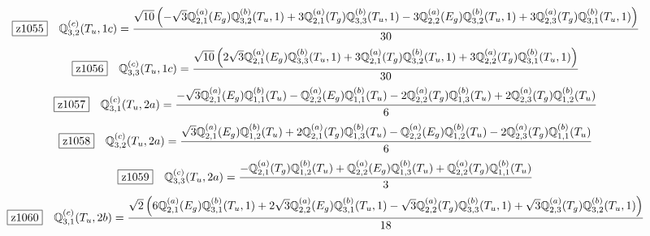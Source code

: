 \documentclass[fleqn,10pt,landscape]{jsarticle}
\begin{document}
\begin{dmath*}
\hspace*{3mm}\fbox{z1055}\quad \mathbb{Q}_{3,2}^{(c)}(T_{u},1c)=\frac{\sqrt{10} \left(- \sqrt{3} \mathbb{Q}_{2,1}^{(a)}(E_{g}) \mathbb{Q}_{3,2}^{(b)}(T_{u},1) + 3 \mathbb{Q}_{2,1}^{(a)}(T_{g}) \mathbb{Q}_{3,3}^{(b)}(T_{u},1) - 3 \mathbb{Q}_{2,2}^{(a)}(E_{g}) \mathbb{Q}_{3,2}^{(b)}(T_{u},1) + 3 \mathbb{Q}_{2,3}^{(a)}(T_{g}) \mathbb{Q}_{3,1}^{(b)}(T_{u},1)\right)}{30}
\end{dmath*}
\begin{dmath*}
\hspace*{3mm}\fbox{z1056}\quad \mathbb{Q}_{3,3}^{(c)}(T_{u},1c)=\frac{\sqrt{10} \left(2 \sqrt{3} \mathbb{Q}_{2,1}^{(a)}(E_{g}) \mathbb{Q}_{3,3}^{(b)}(T_{u},1) + 3 \mathbb{Q}_{2,1}^{(a)}(T_{g}) \mathbb{Q}_{3,2}^{(b)}(T_{u},1) + 3 \mathbb{Q}_{2,2}^{(a)}(T_{g}) \mathbb{Q}_{3,1}^{(b)}(T_{u},1)\right)}{30}
\end{dmath*}
\begin{dmath*}
\hspace*{3mm}\fbox{z1057}\quad \mathbb{Q}_{3,1}^{(c)}(T_{u},2a)=\frac{- \sqrt{3} \mathbb{Q}_{2,1}^{(a)}(E_{g}) \mathbb{Q}_{1,1}^{(b)}(T_{u}) - \mathbb{Q}_{2,2}^{(a)}(E_{g}) \mathbb{Q}_{1,1}^{(b)}(T_{u}) - 2 \mathbb{Q}_{2,2}^{(a)}(T_{g}) \mathbb{Q}_{1,3}^{(b)}(T_{u}) + 2 \mathbb{Q}_{2,3}^{(a)}(T_{g}) \mathbb{Q}_{1,2}^{(b)}(T_{u})}{6}
\end{dmath*}
\begin{dmath*}
\hspace*{3mm}\fbox{z1058}\quad \mathbb{Q}_{3,2}^{(c)}(T_{u},2a)=\frac{\sqrt{3} \mathbb{Q}_{2,1}^{(a)}(E_{g}) \mathbb{Q}_{1,2}^{(b)}(T_{u}) + 2 \mathbb{Q}_{2,1}^{(a)}(T_{g}) \mathbb{Q}_{1,3}^{(b)}(T_{u}) - \mathbb{Q}_{2,2}^{(a)}(E_{g}) \mathbb{Q}_{1,2}^{(b)}(T_{u}) - 2 \mathbb{Q}_{2,3}^{(a)}(T_{g}) \mathbb{Q}_{1,1}^{(b)}(T_{u})}{6}
\end{dmath*}
\begin{dmath*}
\hspace*{3mm}\fbox{z1059}\quad \mathbb{Q}_{3,3}^{(c)}(T_{u},2a)=\frac{- \mathbb{Q}_{2,1}^{(a)}(T_{g}) \mathbb{Q}_{1,2}^{(b)}(T_{u}) + \mathbb{Q}_{2,2}^{(a)}(E_{g}) \mathbb{Q}_{1,3}^{(b)}(T_{u}) + \mathbb{Q}_{2,2}^{(a)}(T_{g}) \mathbb{Q}_{1,1}^{(b)}(T_{u})}{3}
\end{dmath*}
\begin{dmath*}
\hspace*{3mm}\fbox{z1060}\quad \mathbb{Q}_{3,1}^{(c)}(T_{u},2b)=\frac{\sqrt{2} \left(6 \mathbb{Q}_{2,1}^{(a)}(E_{g}) \mathbb{Q}_{3,1}^{(b)}(T_{u},1) + 2 \sqrt{3} \mathbb{Q}_{2,2}^{(a)}(E_{g}) \mathbb{Q}_{3,1}^{(b)}(T_{u},1) - \sqrt{3} \mathbb{Q}_{2,2}^{(a)}(T_{g}) \mathbb{Q}_{3,3}^{(b)}(T_{u},1) + \sqrt{3} \mathbb{Q}_{2,3}^{(a)}(T_{g}) \mathbb{Q}_{3,2}^{(b)}(T_{u},1)\right)}{18}
\end{dmath*}
\end{document}
